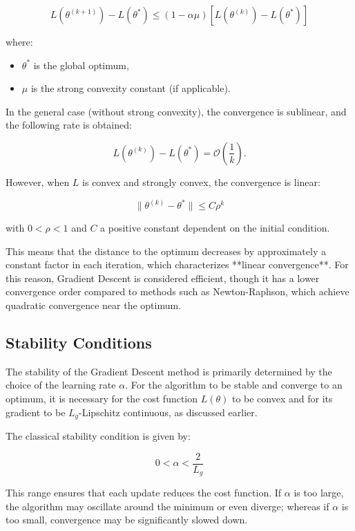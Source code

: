 \documentclass[12pt, letterpaper,conference]{IEEEtran}
\begin{document}
\[
L(\theta^{(k+1)}) - L(\theta^*) \leq (1 - \alpha \mu) [L(\theta^{(k)}) - L(\theta^*)]
\]

where:
\begin{itemize}
    \item \( \theta^* \) is the global optimum,
    \item \( \mu \) is the strong convexity constant (if applicable).
\end{itemize}

In the general case (without strong convexity), the convergence is sublinear, and the following rate is obtained:

\[
L(\theta^{(k)}) - L(\theta^*) = \mathcal{O}\left( \frac{1}{k} \right).
\]

However, when \( L \) is convex and strongly convex, the convergence is linear:

\[
\| \theta^{(k)} - \theta^* \| \leq C \rho^k
\]

with \( 0 < \rho < 1 \) and \( C \) a positive constant dependent on the initial condition.

This means that the distance to the optimum decreases by approximately a constant factor in each iteration, which characterizes **linear convergence**. For this reason, Gradient Descent is considered efficient, though it has a lower convergence order compared to methods such as Newton-Raphson, which achieve quadratic convergence near the optimum.

\vspace{0.25cm}

\subsection{Stability Conditions}

The stability of the Gradient Descent method is primarily determined by the choice of the learning rate \( \alpha \). For the algorithm to be stable and converge to an optimum, it is necessary for the cost function \( L(\theta) \) to be convex and for its gradient to be \( L_g \)-Lipschitz continuous, as discussed earlier.

The classical stability condition is given by:

\[
0 < \alpha < \frac{2}{L_g}
\]

This range ensures that each update reduces the cost function. If \( \alpha \) is too large, the algorithm may oscillate around the minimum or even diverge; whereas if \( \alpha \) is too small, convergence may be significantly slowed down.
\end{document}
